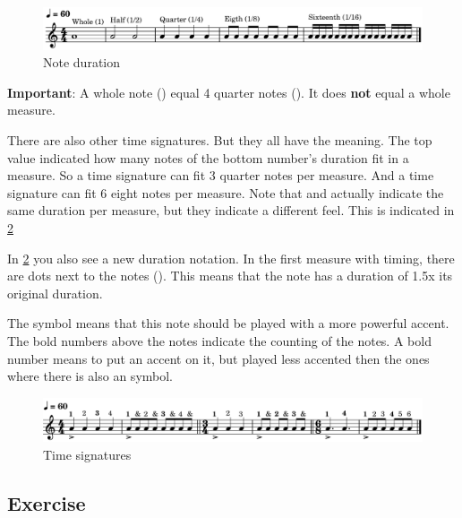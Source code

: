 \begin{figure}[h]
	\centering
	\includegraphics[width=\textwidth]{../../MuseScore/Ukulele/MusicNotation/NoteDurations_Basic.png}
	\caption{Note duration}
	\label{fig:ukulele_note_duration_basic}
\end{figure}

\textbf{Important}: A whole note (\wholeNote) equal 4 quarter notes (\quarterNote). It does \textbf{not} equal a whole measure. \newline

There are also other time signatures. But they all have the meaning. The top value indicated how many notes of the bottom number's duration fit in a measure. So a  time signature can fit 3 quarter notes per measure. And a  time signature can fit 6 eight notes per measure. Note that  and  actually indicate the same duration per measure, but they indicate a different feel. This is indicated in \ref{fig:ukulele_time_signatures}

In \ref{fig:ukulele_time_signatures} you also see a new duration notation. In the first measure with  timing, there are dots next to the notes (\quarterNoteDottedDown). This means that the note has a duration of 1.5x its original duration.

The \lilyAccent symbol means that this note should be played with a more powerful accent. The bold numbers above the notes indicate the counting of the notes. A bold number means to put an accent on it, but played less accented then the ones where there is also an \lilyAccent symbol.

\begin{figure}[h]
	\centering
	\includegraphics[width=\textwidth]{../../MuseScore/Ukulele/MusicNotation/TimeSignature.png}
	\caption{Time signatures}
	\label{fig:ukulele_time_signatures}
\end{figure}

\newpage

\subsection{Exercise}

